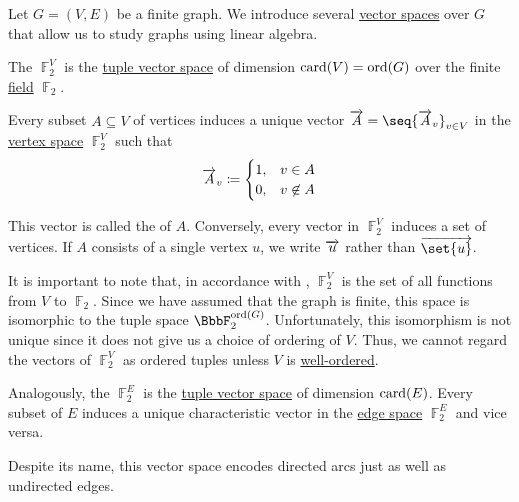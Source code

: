 \begin{definition}\label{def:graph_spaces}
  Let \( G = (V, E) \) be a finite graph. We introduce several \hyperref[def:vector_space]{vector spaces} over \( G \) that allow us to study graphs using linear algebra.

  \begin{thmenum}
     The  \( \BbbF_2^V \) is the \hyperref[def:left_module_of_tuples]{tuple vector space} of dimension \( \operatorname{card}(V) = \operatorname{ord}(G) \) over the finite \hyperref[def:field]{field} \hyperref[thm:f2_is_boolean_algebra]{\( \BbbF_2 \)}.

    Every subset \( A \subseteq V \) of vertices induces a unique vector \( \vect{A} = \seq{ \vect{A}_v }_{v \in V} \) in the \hyperref[def:graph_spaces/vertex]{vertex space} \( \BbbF_2^V \) such that
    \begin{equation*}
      \overrightarrow{A}_v \coloneqq \begin{cases}
        1, &v \in A \\
        0, &v \not\in A
      \end{cases}
    \end{equation*}

    This vector is called the  of \( A \). Conversely, every vector in \( \BbbF_2^V \) induces a set of vertices. If \( A \) consists of a single vertex \( u \), we write \( \overrightarrow{u} \) rather than \( \vect{\set{u}} \).

    It is important to note that, in accordance with , \( \BbbF_2^V \) is the set of all functions from \( V \) to \( \BbbF_2 \). Since we have assumed that the graph is finite, this space is isomorphic to the tuple space \( \BbbF_2^{\ord(G)} \). Unfortunately, this isomorphism is not unique since it does not give us a choice of ordering of \( V \). Thus, we cannot regard the vectors of \( \BbbF_2^V \) as ordered tuples unless \( V \) is \hyperref[def:well_ordered_set]{well-ordered}.

     Analogously, the  \( \BbbF_2^E \) is the \hyperref[def:left_module_of_tuples]{tuple vector space} of dimension \( \operatorname{card}(E) \). Every subset of \( E \) induces a unique characteristic vector in the \hyperref[def:graph_spaces/edge]{edge space} \( \BbbF_2^E \) and vice versa.

    Despite its name, this vector space encodes directed arcs just as well as undirected edges.
  \end{thmenum}
\end{definition}

